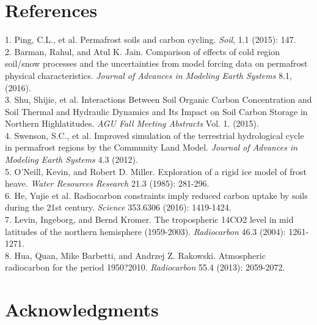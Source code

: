 \documentclass[portait,custom]{sciposter}
\begin{document}
\begin{multicols*}{4}
\section*{References}

1. Ping, C.L., et al. Permafrost soils and carbon cycling. \textit{Soil}, 1.1 (2015): 147.\\
2. Barman, Rahul, and Atul K. Jain. Comparison of effects of cold region soil/snow processes and the uncertainties from model forcing data on permafrost physical characteristics. \textit{Journal of Advances in Modeling Earth Systems} 8.1, (2016).\\
3. Shu, Shijie, et al. Interactions Between Soil Organic Carbon Concentration and Soil Thermal and Hydraulic Dynamics and Its Impact on Soil Carbon Storage in Northern Highlatitudes. \textit{AGU Fall Meeting Abstracts} Vol. 1. (2015).\\
4. Swenson, S.C., et al. Improved simulation of the terrestrial hydrological cycle in permafrost regions by the Community Land Model. \textit{Journal of Advances in Modeling Earth Systems} 4.3 (2012).\\
5. O'Neill, Kevin, and Robert D. Miller. Exploration of a rigid ice model of frost heave. \textit{Water Resources Research} 21.3 (1985): 281-296.\\
6. He, Yujie et al. Radiocarbon constraints imply reduced carbon uptake by soils during the 21st century. \textit{Science} 353.6306 (2016): 1419-1424.\\
7. Levin, Ingeborg, and Bernd Kromer. The tropospheric 14CO2 level in mid latitudes of the northern hemisphere (1959-2003). \textit{Radiocarbon} 46.3 (2004): 1261-1271.\\
8. Hua, Quan, Mike Barbetti, and Andrzej Z. Rakowski. Atmospheric radiocarbon for the period 1950?2010. \textit{Radiocarbon} 55.4 (2013): 2059-2072.\\

\section*{Acknowledgments}


\end{multicols*}
\end{document}
